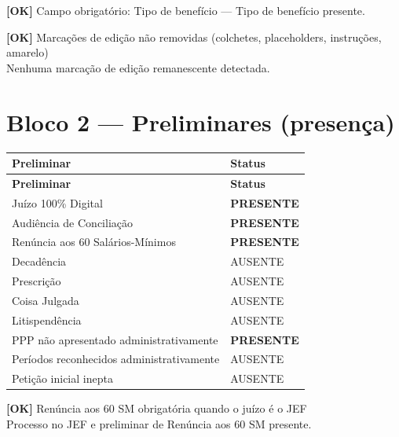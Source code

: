 \documentclass[12pt,a4paper]{article}
\newcommand{\statusOK}[1]{\textcolor{corOK}{\textbf{[OK]}} #1}
\begin{document}
\medskip
\statusOK{Campo obrigatório: Tipo de benefício} --- Tipo de benefício presente.

\medskip
\statusOK{Marcações de edição não removidas (colchetes, placeholders, instruções, amarelo)}\\
Nenhuma marcação de edição remanescente detectada.

\section{Bloco 2 --- Preliminares (presença)}

\begin{longtable}{p{8.5cm} p{4.5cm}}
  \toprule
  \textbf{Preliminar} & \textbf{Status} \\
  \midrule
  \endfirsthead
  \toprule
  \textbf{Preliminar} & \textbf{Status} \\
  \midrule
  \endhead
  Juízo 100\% Digital                           & \textcolor{corOK}{\textbf{PRESENTE}} \\
  Audiência de Conciliação                      & \textcolor{corOK}{\textbf{PRESENTE}} \\
  Renúncia aos 60 Salários-Mínimos              & \textcolor{corOK}{\textbf{PRESENTE}} \\
  Decadência                                    & AUSENTE \\
  Prescrição                                    & AUSENTE \\
  Coisa Julgada                                 & AUSENTE \\
  Litispendência                                & AUSENTE \\
  PPP não apresentado administrativamente       & \textcolor{corOK}{\textbf{PRESENTE}} \\
  Períodos reconhecidos administrativamente     & AUSENTE \\
  Petição inicial inepta                        & AUSENTE \\
  \bottomrule
\end{longtable}

\statusOK{Renúncia aos 60 SM obrigatória quando o juízo é o JEF}\\
Processo no JEF e preliminar de Renúncia aos 60 SM presente.

\end{document}

